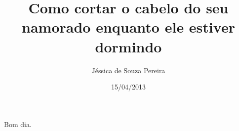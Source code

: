 \documentclass{article}
\author{Jéssica de Souza Pereira}
\date{15/04/2013}
\title{Como cortar o cabelo do seu namorado enquanto ele estiver dormindo}
\begin{document}
\maketitle

Bom dia.
\end{document}
